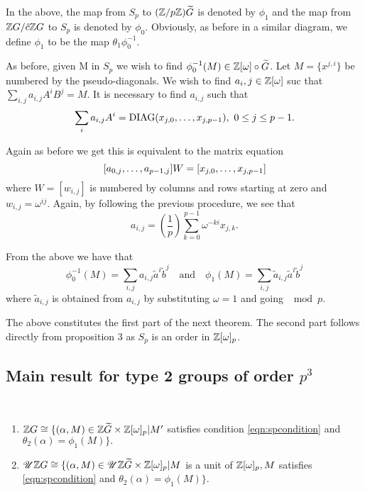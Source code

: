 \documentclass[11pt]{report}
\begin{document}
In the above, the map from $S_p$ to $(\integers/p\integers)\widetilde{G}$ is denoted by $\phi_1$ and the 
map from $\intG/\hat{c}\intG$ to
$S_p$ is denoted by $\phi_0$. Obviously, as before in a similar diagram, 
we define $\phi_1$ to be the map
$\theta_1\phi_0^{-1}$.


As before, given M in $S_p$ we wish to find $\phi_0^{-1}(M)\in \iom
\circ \widetilde{G}$. Let $M = \{x^{j,i}\}$ be
numbered by the pseudo-diagonals. We wish to find $a_i,j\in \iom$ suc that 
$\sum_{i,j}a_{i,j}A^iB^j = M$. It is
necessary to find $a_{i,j}$ such that
\[
\sum_ia_{i,j}A^i=\mathrm{DIAG}(\series{j,0}{j,p-1}),\ 0\le j\le p-1.
\]

Again as before we get this is equivalent to the matrix equation
\[
[\series[a]{0,j}{p-1,j}]W = [\series{j,0}{j,p-1}]
\]
where $W = [w_{i,j}]$ is numbered by columns and rows starting at zero and 
$w_{i,j} = \omega^{ij}$. Again, by
following the previous procedure, we see that
\[
a_{i,j} = (\frac{1}{p})\sum_{k=0}^{p-1}\omega^{-ki}x_{j,k}.
\]

From the above we have that   
\[
\phi_0^{-1}(M) = \sum_{i,j}a_{i,j}\tilde{a}^i\tilde{b}^j \quad
\mathrm{and}\quad
\phi_1(M) = \sum_{i,j}\tilde{a}_{i,j}\tilde{a}^i\tilde{b}^j
\]
where $\tilde{a}_{i,j}$ is obtained from $a_{i,j}$ by substituting $\omega = 1$
 and going 
$\mod p$.


        The above constitutes the first part of the next theorem. The 
second part follows
directly from proposition 3 as $S_p$ is an order in $\iom_p$.



\subsection{Main result for type 2 groups of order $p^3$}
\begin{theorem}~\\
\begin{enumerate}
\item{}\( \intG \cong \{(\alpha,M) \in \intGtil\times\iom_p \vert M'\) satisfies
condition \ref{eqn:spcondition} and \(\theta_2(\alpha)=\phi_1(M)\}.\)
\item \(\ug\intG \cong \{(\alpha,M) \in \ug\intGtil\times\iom_p \vert M\) is
a unit of \(\iom_p, M\) satisfies  \ref{eqn:spcondition} and 
 \(\theta_2(\alpha)=\phi_1(M)\}.\)
\end{enumerate}
\end{theorem}
\end{document}
